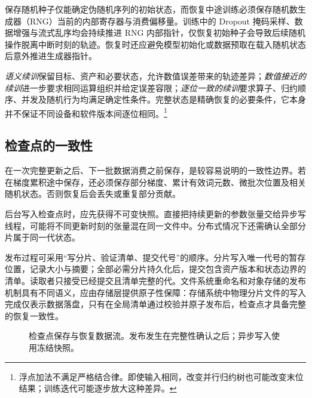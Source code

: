 \documentclass[../textbook.tex]{subfiles}
\begin{document}
保存随机种子仅能确定伪随机序列的初始状态，而恢复中途训练必须保存随机数生成器（RNG）当前的内部寄存器与消费偏移量。训练中的 Dropout 掩码采样、数据增强与流式乱序均会持续推进 RNG 内部指针，仅恢复初始种子会导致后续随机操作脱离中断时刻的轨迹。恢复时还应避免模型初始化或数据预取在载入随机状态后意外推进生成器指针。

\emph{语义续训}保留目标、资产和必要状态，允许数值误差带来的轨迹差异；\emph{数值接近的续训}进一步要求相同运算组织并给定误差容限；\emph{逐位一致的续训}要求算子、归约顺序、并发及随机行为均满足确定性条件。完整状态是精确恢复的必要条件，它本身并不保证不同设备和软件版本间逐位相同。\footnote{浮点加法不满足严格结合律。即使输入相同，改变并行归约树也可能改变末位结果；训练迭代可能逐步放大这种差异。}

\subsection{检查点的一致性}
在一次完整更新之后、下一批数据消费之前保存，是较容易说明的一致性边界。若在梯度累积途中保存，还必须保存部分梯度、累计有效词元数、微批次位置及相关随机状态。否则恢复后会丢失或重复部分贡献。

后台写入检查点时，应先获得不可变快照。直接把持续更新的参数张量交给异步写线程，可能将不同更新时刻的张量混在同一文件中。分布式情况下还需确认全部分片属于同一代状态。

发布过程可采用“写分片、验证清单、提交代号”的顺序。分片写入唯一代号的暂存位置，记录大小与摘要；全部必需分片持久化后，提交包含资产版本和状态边界的清单。读取者只接受已经提交且清单完整的代。文件系统重命名和对象存储的发布机制具有不同语义，应由存储层提供原子性保障：存储系统中物理分片文件的写入完成仅表示数据落盘，只有在全局清单通过校验并原子发布后，检查点才具备完整的恢复一致性。

\begin{figure}[htbp]
\centering
{}
\caption[检查点保存与恢复数据流]{检查点保存与恢复数据流。发布发生在完整性确认之后；异步写入使用冻结快照。}
\label{fig:stability-recovery}
\end{figure}
\end{document}
